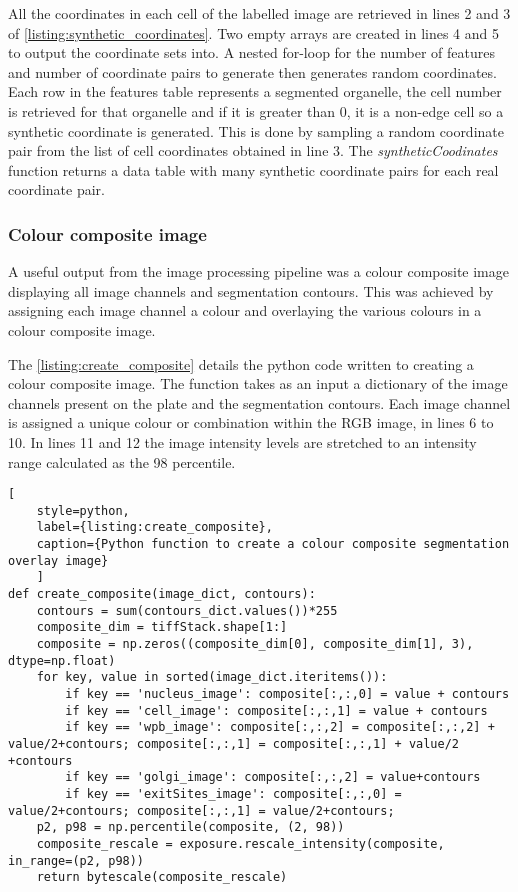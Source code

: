 All the coordinates in each cell of the labelled image are retrieved in lines 2 and 3 of \autoref{listing:synthetic_coordinates}. Two empty arrays are created in lines 4 and 5 to output the coordinate sets into. A nested for-loop for the number of features and number of coordinate pairs to generate then generates random coordinates. Each row in the features table represents a segmented organelle, the cell number is retrieved for that organelle and if it is greater than 0, it is a non-edge cell so a synthetic coordinate is generated. This is done by sampling a random coordinate pair from the list of cell coordinates obtained in line 3. The \emph{syntheticCoodinates} function returns a data table with many synthetic coordinate pairs for each real coordinate pair.

\subsubsection{Colour composite image}
A useful output from the image processing pipeline was a colour composite image displaying all image channels and segmentation contours. This was achieved by assigning each image channel a colour and overlaying the various colours in a colour composite image.

The \autoref{listing:create_composite} details the python code written to creating a colour composite image. The function takes as an input a dictionary of the image channels present on the plate and the segmentation contours. Each image channel is assigned a unique colour or combination within the RGB image, in lines 6 to 10. In lines 11 and 12 the image intensity levels are stretched to an intensity range calculated as the 98 percentile.

\begin{lstlisting}[
	style=python,
	label={listing:create_composite},
	caption={Python function to create a colour composite segmentation overlay image}
	]
def create_composite(image_dict, contours):
    contours = sum(contours_dict.values())*255
    composite_dim = tiffStack.shape[1:]
    composite = np.zeros((composite_dim[0], composite_dim[1], 3), dtype=np.float)
    for key, value in sorted(image_dict.iteritems()):
        if key == 'nucleus_image': composite[:,:,0] = value + contours
        if key == 'cell_image': composite[:,:,1] = value + contours
        if key == 'wpb_image': composite[:,:,2] = composite[:,:,2] + value/2+contours; composite[:,:,1] = composite[:,:,1] + value/2 +contours
        if key == 'golgi_image': composite[:,:,2] = value+contours
        if key == 'exitSites_image': composite[:,:,0] = value/2+contours; composite[:,:,1] = value/2+contours;
    p2, p98 = np.percentile(composite, (2, 98))
    composite_rescale = exposure.rescale_intensity(composite, in_range=(p2, p98))
    return bytescale(composite_rescale)
\end{lstlisting}

